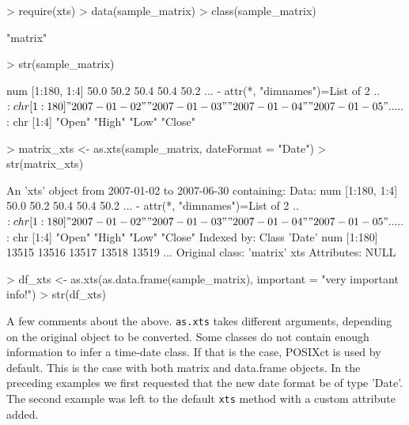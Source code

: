 \documentclass{article}
\begin{document}
\begin{Schunk}
\begin{Sinput}
> require(xts)
> data(sample_matrix)
> class(sample_matrix)
\end{Sinput}
\begin{Soutput}
[1] "matrix"
\end{Soutput}
\begin{Sinput}
> str(sample_matrix)
\end{Sinput}
\begin{Soutput}
 num [1:180, 1:4] 50.0 50.2 50.4 50.4 50.2 ...
 - attr(*, "dimnames")=List of 2
  ..$ : chr [1:180] "2007-01-02" "2007-01-03" "2007-01-04" "2007-01-05" ...
  ..$ : chr [1:4] "Open" "High" "Low" "Close"
\end{Soutput}
\begin{Sinput}
> matrix_xts <- as.xts(sample_matrix, dateFormat = "Date")
> str(matrix_xts)
\end{Sinput}
\begin{Soutput}
An 'xts' object from 2007-01-02 to 2007-06-30 containing:
  Data: num [1:180, 1:4] 50.0 50.2 50.4 50.4 50.2 ...
 - attr(*, "dimnames")=List of 2
  ..$ : chr [1:180] "2007-01-02" "2007-01-03" "2007-01-04" "2007-01-05" ...
  ..$ : chr [1:4] "Open" "High" "Low" "Close"
  Indexed by: Class 'Date'  num [1:180] 13515 13516 13517 13518 13519 ...
  Original class: 'matrix'  
  xts Attributes:  
 NULL
\end{Soutput}
\begin{Sinput}
> df_xts <- as.xts(as.data.frame(sample_matrix), important = "very important info!")
> str(df_xts)
\end{Sinput}
\end{Schunk}

A few comments about the above. {\tt as.xts} takes different arguments, depending
on the original object to be converted.  Some classes do not contain enough
information to infer a time-date class. If that is the case, POSIXct is used by
default. This is the case with both matrix and data.frame objects. In the preceding
examples we first requested that the new date format be of type 'Date'.  The
second example was left to the default {\tt xts} method
with a custom attribute added.
\end{document}
